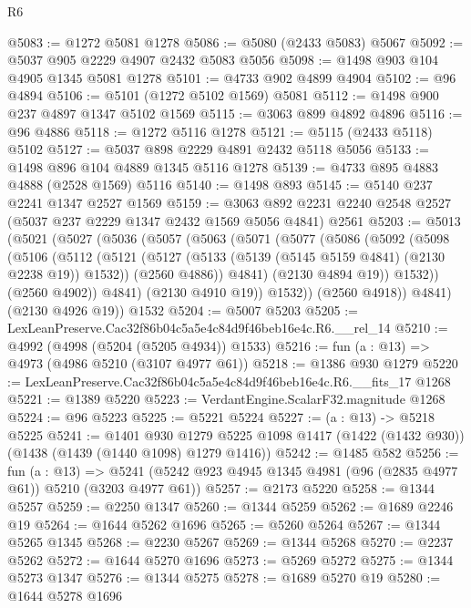 \begin{lexlean}{R6}
\begin{coremodule}
@5083 := @1272 @5081 @1278
@5086 := @5080 (@2433 @5083) @5067
@5092 := @5037 @905 @2229 @4907 @2432 @5083 @5056
@5098 := @1498 @903 @104 @4905 @1345 @5081 @1278
@5101 := @4733 @902 @4899 @4904
@5102 := @96 @4894
@5106 := @5101 (@1272 @5102 @1569) @5081
@5112 := @1498 @900 @237 @4897 @1347 @5102 @1569
@5115 := @3063 @899 @4892 @4896
@5116 := @96 @4886
@5118 := @1272 @5116 @1278
@5121 := @5115 (@2433 @5118) @5102
@5127 := @5037 @898 @2229 @4891 @2432 @5118 @5056
@5133 := @1498 @896 @104 @4889 @1345 @5116 @1278
@5139 := @4733 @895 @4883 @4888 (@2528 @1569) @5116
@5140 := @1498 @893
@5145 := @5140 @237 @2241 @1347 @2527 @1569
@5159 := @3063 @892 @2231 @2240 @2548 @2527 (@5037 @237 @2229 @1347 @2432 @1569 @5056 @4841) @2561
@5203 := @5013
    (@5021
      (@5027
        (@5036
          (@5057
            (@5063
              (@5071
                (@5077
                  (@5086
                    (@5092
                      (@5098
                        (@5106
                          (@5112
                            (@5121
                              (@5127 (@5133 (@5139 (@5145 @5159 @4841) (@2130 @2238 @19)) @1532))
                              (@2560 @4886))
                            @4841)
                          (@2130 @4894 @19))
                        @1532))
                    (@2560 @4902))
                  @4841)
                (@2130 @4910 @19))
              @1532))
          (@2560 @4918))
        @4841)
      (@2130 @4926 @19))
    @1532
@5204 := @5007 @5203
@5205 := LexLeanPreserve.Cac32f86b04c5a5e4c84d9f46beb16e4c.R6.__rel_14
@5210 := @4992 (@4998 (@5204 (@5205 @4934)) @1533)
@5216 := fun (a : @13) => @4973 (@4986 @5210 (@3107 @4977 @61))
@5218 := @1386 @930 @1279
@5220 := LexLeanPreserve.Cac32f86b04c5a5e4c84d9f46beb16e4c.R6.__fits_17 @1268
@5221 := @1389 @5220
@5223 := VerdantEngine.ScalarF32.magnitude @1268
@5224 := @96 @5223
@5225 := @5221 @5224
@5227 := (a : @13) -> @5218 @5225
@5241 := @1401
    @930
    @1279
    @5225
    @1098
    @1417
    (@1422 (@1432 @930))
    (@1438 (@1439 (@1440 @1098) @1279 @1416))
@5242 := @1485 @582
@5256 := fun (a : @13) =>
  @5241 (@5242 @923 @4945 @1345 @4981 (@96 (@2835 @4977 @61)) @5210 (@3203 @4977 @61))
@5257 := @2173 @5220
@5258 := @1344 @5257
@5259 := @2250 @1347
@5260 := @1344 @5259
@5262 := @1689 @2246 @19
@5264 := @1644 @5262 @1696
@5265 := @5260 @5264
@5267 := @1344 @5265 @1345
@5268 := @2230 @5267
@5269 := @1344 @5268
@5270 := @2237 @5262
@5272 := @1644 @5270 @1696
@5273 := @5269 @5272
@5275 := @1344 @5273 @1347
@5276 := @1344 @5275
@5278 := @1689 @5270 @19
@5280 := @1644 @5278 @1696

\end{coremodule}
\end{lexlean}
